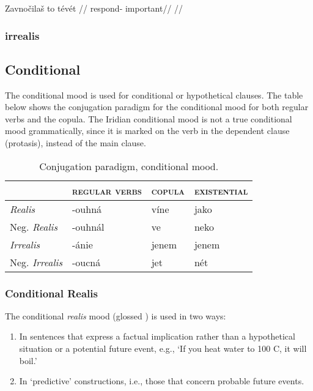 \pex
\begingl
\gla Zavno\v{c}ila\v{s} to t\'ev\'et //
\glb respond-  important//
\glft {}//
\endgl
\xe

\subsubsection{irrealis}

\subsection{Conditional}
\par The conditional mood is used for conditional or hypothetical clauses. The table below shows the conjugation paradigm for the conditional mood for both regular verbs and the copula. The Iridian conditional mood is not a true conditional mood grammatically, since it is marked on the verb in the dependent clause (protasis), instead of the main clause.

\begin{table}[h!]
	\centering \small
	\caption{Conjugation paradigm, conditional mood.}
	\begin{tabu} to 0.8 \textwidth	{Y[1.3]MMM}
		\toprule
		&{\scshape regular verbs} & {\scshape copula} & {\scshape existential}\\
		\midrule

		\textit{Realis} &-ouhn\'a &v\'ine & jako\\
		Neg. \textit{Realis}&-ouhn\'al&ve&neko\\

		\textit{Irrealis} & -\'anie & jenem & jenem\\
		Neg. \textit{Irrealis} & -oucn\'a & jet & n\'et\\
		\bottomrule
	\end{tabu}
\end{table}

\subsubsection{Conditional Realis}

\par The conditional \textit{realis} mood (glossed ) is used in two ways:
\begin{enumerate}
	\item In sentences that express a factual implication rather than a hypothetical situation or a potential future event, e.g., `If you heat water to 100 C, it will boil.'
	\item In `predictive' constructions, i.e., those that concern probable future events.
\end{enumerate}

